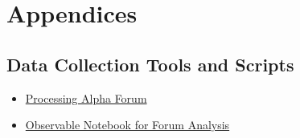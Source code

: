 \section{Appendices}

\subsection{Data Collection Tools and Scripts}

\begin{itemize}
    \item \href{https://forum.processing.org/alpha/}{Processing Alpha Forum}
    \item \href{https://observablehq.com/d/042b1cf42ea9bb5e}{Observable Notebook for Forum Analysis}
\end{itemize}
